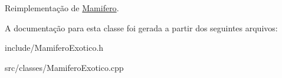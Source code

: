Reimplementação de \hyperlink{classMamifero_a88e6c2efe9180611486f82d4dbf308ba}{Mamifero}.



A documentação para esta classe foi gerada a partir dos seguintes arquivos\+:\begin{DoxyCompactItemize}
\item 
include/Mamifero\+Exotico.\+h\item 
src/classes/Mamifero\+Exotico.\+cpp\end{DoxyCompactItemize}
